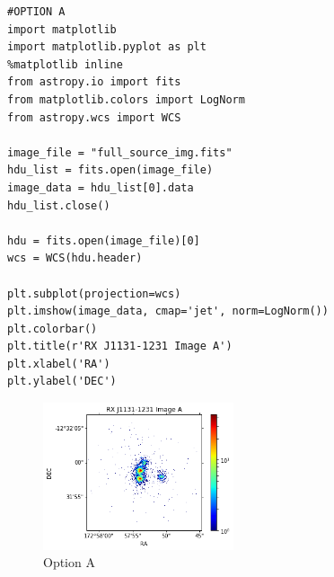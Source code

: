 \documentclass[11pt,letterpaper]{article}
\begin{document}
\begin{lstlisting}
#OPTION A
import matplotlib
import matplotlib.pyplot as plt
%matplotlib inline
from astropy.io import fits
from matplotlib.colors import LogNorm
from astropy.wcs import WCS

image_file = "full_source_img.fits"
hdu_list = fits.open(image_file)
image_data = hdu_list[0].data
hdu_list.close()

hdu = fits.open(image_file)[0]
wcs = WCS(hdu.header)

plt.subplot(projection=wcs)
plt.imshow(image_data, cmap='jet', norm=LogNorm())
plt.colorbar()
plt.title(r'RX J1131-1231 Image A')
plt.xlabel('RA')
plt.ylabel('DEC')
\end{lstlisting}
\clearpage
\begin{figure}[h]
	\centering
	\includegraphics[width=0.5\textwidth]{pictures/optionA}
	\caption{Option A}
	\label{fig:2DopA}
\end{figure}
\end{document}
